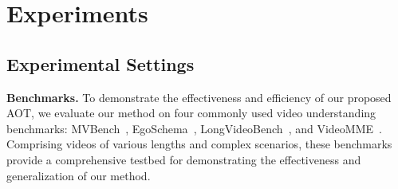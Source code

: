 \section{Experiments}
\label{sec:experiments}


\subsection{Experimental Settings} \label{sec:experimental_settings}
\noindent \textbf{Benchmarks.}
To demonstrate the effectiveness and efficiency of our proposed AOT, we evaluate our method on four commonly used video understanding benchmarks: MVBench~\cite{li2024mvbench}, EgoSchema~\cite{mangalam2023egoschema}, LongVideoBench~\cite{wu2024longvideobench}, and VideoMME~\cite{fu2025video}. Comprising videos of various lengths and complex scenarios, these benchmarks provide a comprehensive testbed for demonstrating the effectiveness and generalization of our method.



